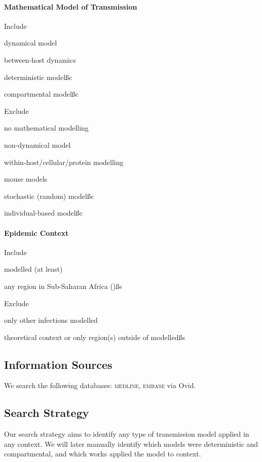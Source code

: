 \documentclass{article}
\begin{document}
\paragraph{Mathematical Model of Transmission}\n
\begin{criteria}{Include}
  \item dynamical model
  \item between-host dynamics
  \item deterministic model\ss{c}
  \item compartmental model\ss{c}
\end{criteria}
\begin{criteria}{Exclude}
  \item no mathematical modelling
  \item non-dynamical model
  \item within-host/cellular/protein modelling
  \item mouse models
  \item stochastic (random) model\ss{c}
  \item individual-based model\ss{c}
\end{criteria}
\paragraph{Epidemic Context}\n
\begin{criteria}{Include}
  \item \hiv modelled (at least)
  \item any region in Sub-Saharan Africa (\ssa)\ss{s}
\end{criteria}
\begin{criteria}{Exclude}
  \item only other infections modelled
  \item theoretical context or only region(s) outside of \ssa modelled\ss{s}  
\end{criteria}
\clearpage %
\subsection{Information Sources}
We search the following databases: \textsc{medline}, \textsc{embase} via Ovid.
\subsection{Search Strategy}
Our search strategy aims to identify
any type of \hiv transmission model applied in any context.
We will later manually identify
which models were deterministic and compartmental,
and which works applied the model to \ssa context.
\end{document}
